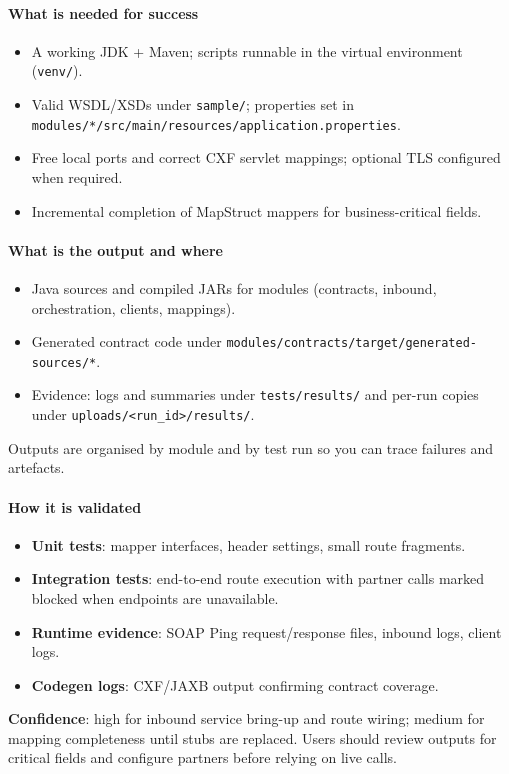 \documentclass[11pt,a4paper]{article}
\begin{document}
\paragraph*{What is needed for success}
\begin{itemize}
  \item A working JDK + Maven; scripts runnable in the virtual environment (\texttt{venv/}).\
  \item Valid WSDL/XSDs under \texttt{sample/}; properties set in \texttt{modules/*/src/main/resources/application.properties}.\
  \item Free local ports and correct CXF servlet mappings; optional TLS configured when required.\
  \item Incremental completion of MapStruct mappers for business-critical fields.\
\end{itemize}

\paragraph*{What is the output and where}
\begin{itemize}
  \item Java sources and compiled JARs for modules (contracts, inbound, orchestration, clients, mappings).\
  \item Generated contract code under \texttt{modules/contracts/target/generated-sources/*}.\
  \item Evidence: logs and summaries under \texttt{tests/results/} and per-run copies under \texttt{uploads/\textless{}run\_id\textgreater{}/results/}.\
\end{itemize}
Outputs are organised by module and by test run so you can trace failures and artefacts.

\paragraph*{How it is validated}
\begin{itemize}
  \item \textbf{Unit tests}: mapper interfaces, header settings, small route fragments.\
  \item \textbf{Integration tests}: end-to-end route execution with partner calls marked blocked when endpoints are unavailable.\
  \item \textbf{Runtime evidence}: SOAP Ping request/response files, inbound logs, client logs.\
  \item \textbf{Codegen logs}: CXF/JAXB output confirming contract coverage.\
\end{itemize}
\textbf{Confidence}: high for inbound service bring-up and route wiring; medium for mapping completeness until stubs are replaced. Users should review outputs for critical fields and configure partners before relying on live calls.
\end{document}
